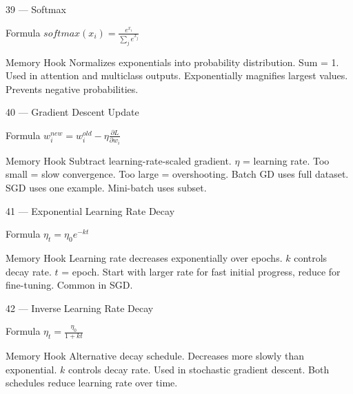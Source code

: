 \documentclass[aspectratio=169,8pt]{beamer}
\begin{document}
	\begin{frame}{39 --- Softmax}
		\begin{block}{Formula}
			$softmax(x_i) = \frac{e^{x_i}}{\sum_j e^{x_j}}$
		\end{block}
		\begin{block}{Memory Hook}
			Normalizes exponentials into probability distribution. Sum = 1. Used in attention and multiclass outputs. Exponentially magnifies largest values. Prevents negative probabilities.
		\end{block}
	\end{frame}
	
	\begin{frame}{40 --- Gradient Descent Update}
		\begin{block}{Formula}
			$w_i^{new} = w_i^{old} - \eta\frac{\partial L}{\partial w_i}$
		\end{block}
		\begin{block}{Memory Hook}
			Subtract learning-rate-scaled gradient. $\eta$ = learning rate. Too small = slow convergence. Too large = overshooting. Batch GD uses full dataset. SGD uses one example. Mini-batch uses subset.
		\end{block}
	\end{frame}
	
	\begin{frame}{41 --- Exponential Learning Rate Decay}
		\begin{block}{Formula}
			$\eta_t = \eta_0 e^{-kt}$
		\end{block}
		\begin{block}{Memory Hook}
			Learning rate decreases exponentially over epochs. $k$ controls decay rate. $t$ = epoch. Start with larger rate for fast initial progress, reduce for fine-tuning. Common in SGD.
		\end{block}
	\end{frame}
	
	\begin{frame}{42 --- Inverse Learning Rate Decay}
		\begin{block}{Formula}
			$\eta_t = \frac{\eta_0}{1 + kt}$
		\end{block}
		\begin{block}{Memory Hook}
			Alternative decay schedule. Decreases more slowly than exponential. $k$ controls decay rate. Used in stochastic gradient descent. Both schedules reduce learning rate over time.
		\end{block}
	\end{frame}
	
\end{document}
